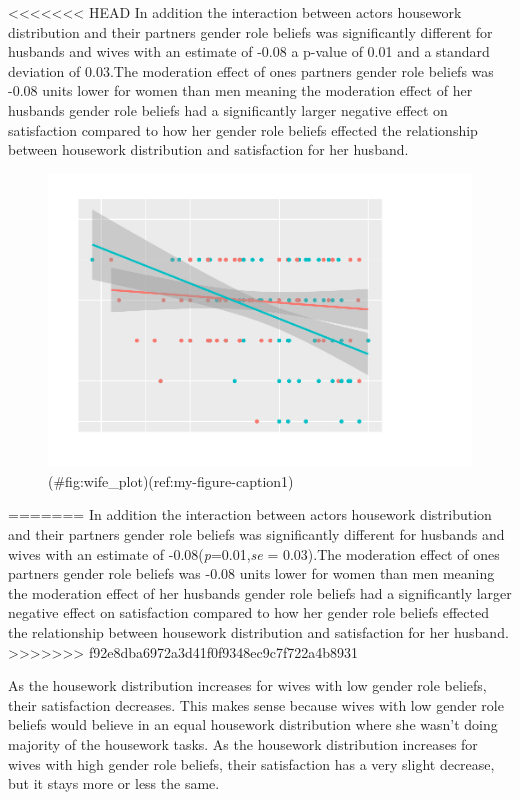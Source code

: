 \documentclass[
  english,
  man,floatsintext]{apa6}
\begin{document}
<<<<<<< HEAD
In addition the interaction between actors housework distribution and their partners gender role beliefs was significantly different for husbands and wives with an estimate of -0.08 a p-value of 0.01 and a standard deviation of 0.03.The moderation effect of ones partners gender role beliefs was -0.08 units lower for women than men meaning the moderation effect of her husbands gender role beliefs had a significantly larger negative effect on satisfaction compared to how her gender role beliefs effected the relationship between housework distribution and satisfaction for her husband.

\begin{figure}
\centering
\includegraphics{results_files/figure-latex/wife_plot-1.pdf}
\caption{(\#fig:wife\_plot)(ref:my-figure-caption1)}
\end{figure}
=======
In addition the interaction between actors housework distribution and their partners gender role beliefs was significantly different for husbands and wives with an estimate of -0.08(\emph{p}=0.01,\emph{se} = 0.03).The moderation effect of ones partners gender role beliefs was -0.08 units lower for women than men meaning the moderation effect of her husbands gender role beliefs had a significantly larger negative effect on satisfaction compared to how her gender role beliefs effected the relationship between housework distribution and satisfaction for her husband.
>>>>>>> f92e8dba6972a3d41f0f9348ec9c7f722a4b8931



As the housework distribution increases for wives with low gender role beliefs, their satisfaction decreases. This makes sense because wives with low gender role beliefs would believe in an equal housework distribution where she wasn't doing majority of the housework tasks. As the housework distribution increases for wives with high gender role beliefs, their satisfaction has a very slight decrease, but it stays more or less the same.
\end{document}
